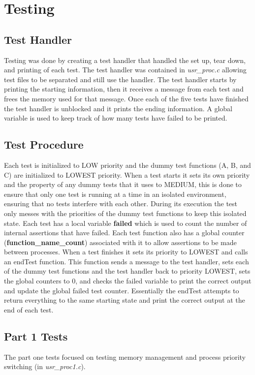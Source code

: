 \documentclass[11pt, oneside]{article}
\begin{document}
\clearpage
\section{Testing}

\subsection{Test Handler}
Testing was done by creating a test handler that handled the set up, tear down, and printing of each test. The test handler was contained in \textit{usr\_proc.c} allowing test files to be separated and still use the handler. The test handler starts by printing the starting information, then it receives a message from each test and frees the memory used for that message. Once each of the five tests have finished the test handler is unblocked and it prints the ending information. A global variable is used to keep track of how many tests have failed to be printed.

\subsection{Test Procedure} Each test is initialized to LOW priority and the dummy test functions (A, B, and C) are initialized to LOWEST priority. When a test starts it sets its own priority and the property of any dummy tests that it uses to MEDIUM, this is done to ensure that only one test is running at a time in an isolated environment, ensuring that no tests interfere with each other. During its execution the test only messes with the priorities of the dummy test functions to keep this isolated state. Each test has a local variable \textbf{failed} which is used to count the number of internal assertions that have failed. Each test function also has a global counter (\textbf{function\_name\_count}) associated with it to allow assertions to be made between processes. When a test finishes it sets its priority to LOWEST and calls an endTest function. This function sends a message to the test handler, sets each of the dummy test functions and the test handler back to priority LOWEST, sets the global counters to 0, and checks the failed variable to print the correct output and update the global failed test counter. Essentially the endTest attempts to return everything to the same starting state and print the correct output at the end of each test.

\subsection{Part 1 Tests}
The part one tests focused on testing memory management and process priority switching (in \textit{usr\_proc1.c}).
\end{document}
